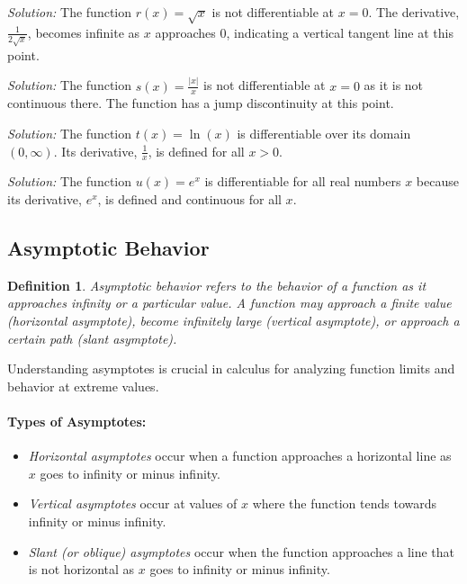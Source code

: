 \documentclass[a4paper,12pt]{book}
\newenvironment{solution}[1][]
{\par\noindent\textit{Solution:} \rmfamily}{\medskip}
\newtheorem{definition}{Definition}
\begin{document}
\begin{solution}[7]
The function \( r(x) = \sqrt{x} \) is not differentiable at \( x = 0 \). The derivative, \( \frac{1}{2\sqrt{x}} \), becomes infinite as \( x \) approaches 0, indicating a vertical tangent line at this point.
\end{solution}

\begin{solution}[8]
The function \( s(x) = \frac{|x|}{x} \) is not differentiable at \( x = 0 \) as it is not continuous there. The function has a jump discontinuity at this point.
\end{solution}

\begin{solution}[9]
The function \( t(x) = \ln(x) \) is differentiable over its domain \( (0, \infty) \). Its derivative, \( \frac{1}{x} \), is defined for all \( x > 0 \).
\end{solution}

\begin{solution}[10]
The function \( u(x) = e^x \) is differentiable for all real numbers \( x \) because its derivative, \( e^x \), is defined and continuous for all \( x \).
\end{solution}

\subsection{Asymptotic Behavior}
\begin{definition}
Asymptotic behavior refers to the behavior of a function as it approaches infinity or a particular value. A function may approach a finite value (horizontal asymptote), become infinitely large (vertical asymptote), or approach a certain path (slant asymptote).
\end{definition}

Understanding asymptotes is crucial in calculus for analyzing function limits and behavior at extreme values.

\paragraph{Types of Asymptotes:}
\begin{itemize}
    \item \textit{Horizontal asymptotes} occur when a function approaches a horizontal line as \( x \) goes to infinity or minus infinity.
    \item \textit{Vertical asymptotes} occur at values of \( x \) where the function tends towards infinity or minus infinity.
    \item \textit{Slant (or oblique) asymptotes} occur when the function approaches a line that is not horizontal as \( x \) goes to infinity or minus infinity.
\end{itemize}
\end{document}

